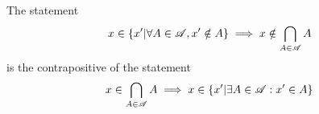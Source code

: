 \documentclass[main.tex]{subfiles}
\begin{document}
\subproblem{}\label{6e}

\begin{remark}
	The statement
	\[x \in \{x'|\forall A \in \mathscr{A}, x' \notin A\} \implies x \notin \bigcap\limits_{A \in \mathscr{A}} {A}\]
	is the contrapositive of the statement
	\[x \in \bigcap\limits_{A \in \mathscr{A}} {A} \implies x \in \{x'|\exists A \in \mathscr{A} : x' \in A\}\]
\end{remark}
\end{document}
